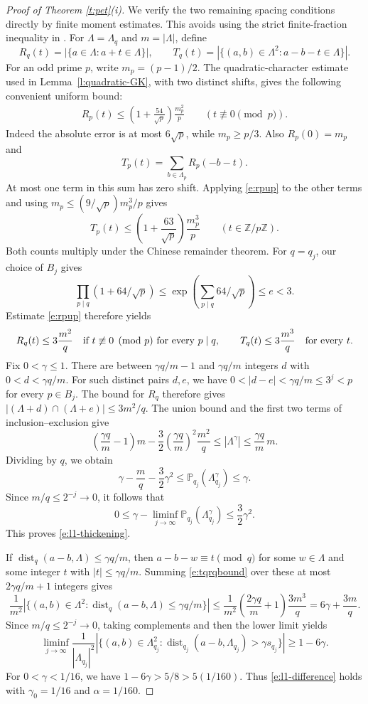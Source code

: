 \documentclass[12pt,reqno]{amsart}
\numberwithin{equation}{section}
\theoremstyle{definition}
\theoremstyle{remark}
\begin{document}
\begin{proof}[Proof of Theorem \ref{t:pet}\textup{(i)}]
We verify the two remaining spacing conditions directly by finite
moment estimates. This avoids using the strict finite-fraction
inequality in \cite[Lemma~3.2]{L09}. For $\Lambda=\Lambda_q$ and
$m=|\Lambda|$, define
\[
 R_q(t)=|\{a\in\Lambda:a+t\in\Lambda\}|,
 \qquad
 T_q(t)=|\{(a,b)\in\Lambda^2:a-b-t\in\Lambda\}|.
\]
For an odd prime $p$, write $m_p=(p-1)/2$. The quadratic-character
estimate used in Lemma~\ref{l:quadratic-GK}, with two distinct shifts,
gives the following convenient uniform bound:
\begin{align}\label{e:rpup}
    R_p(t)\leq\left(1+\frac{54}{\sqrt p}\right)\frac{m_p^2}{p}
 \qquad(t\not\equiv0\pmod p).
\end{align}
Indeed the absolute error is at most $6\sqrt p$, while $m_p\geq p/3$.
Also $R_p(0)=m_p$ and
\[
 T_p(t)=\sum_{b\in\Lambda_p}R_p(-b-t).
\]
At most one term in this sum has zero shift. Applying \eqref{e:rpup} to the other terms and using
$m_p\leq(9/\sqrt p)m_p^3/p$ gives
\[
 T_p(t)\leq\left(1+\frac{63}{\sqrt p}\right)\frac{m_p^3}{p}
 \qquad(t\in\mathbb Z/p\mathbb Z).
\]
Both counts multiply under the Chinese remainder theorem. For
\(q=q_j\), our choice of \(B_j\) gives
\[\prod_{p\mid q}(1+64/\sqrt p)
\leq\exp(\sum_{p\mid q}64/\sqrt p)\leq e<3.\]
Estimate \eqref{e:rpup} therefore yields
\begin{align}\label{e:tqrqbound}
 R_q(t)\leq3\frac{m^2}{q}
 \quad\hbox{if }t\not\equiv0\pmod p\text{ for every }p\mid q,
 \qquad
 T_q(t)\leq3\frac{m^3}{q}\quad\hbox{for every }t.
\end{align}
Fix \(0<\gamma\leq1\). There are between \(\gamma q/m-1\) and
\(\gamma q/m\) integers \(d\) with \(0<d<\gamma q/m\).
For such distinct pairs \(d,e\), we have
\(0<|d-e|<\gamma q/m\leq3^j<p\) for every \(p\in B_j\).
The bound for \(R_q\) therefore gives
\(|(\Lambda+d)\cap(\Lambda+e)|\leq3m^2/q\).
The union bound and the first two terms of inclusion--exclusion give
\[
 \left(\frac{\gamma q}{m}-1\right)m
 -\frac32\left(\frac{\gamma q}{m}\right)^2\frac{m^2}{q}
 \leq|\Lambda^\gamma|
 \leq\frac{\gamma q}{m}\,m.
\]
Dividing by \(q\), we obtain
\[
 \gamma-\frac mq-\frac32\gamma^2
 \leq\mathbb P_{q_j}(\Lambda_{q_j}^{\gamma})\leq\gamma.
\]
Since \(m/q\leq2^{-j}\to0\), it follows that
\[
 0\leq\gamma-\liminf_{j\to\infty}
 \mathbb P_{q_j}(\Lambda_{q_j}^{\gamma})
 \leq\frac32\gamma^2.
\]
This proves \eqref{e:l1-thickening}.

If \(\operatorname{dist}_q(a-b,\Lambda)\leq\gamma q/m\), then
\(a-b-w\equiv t\pmod q\) for some \(w\in\Lambda\) and some
integer \(t\) with \(|t|\leq\gamma q/m\).
Summing \eqref{e:tqrqbound} over these at most
\(2\gamma q/m+1\) integers gives
\[
 \frac1{m^2}
 |\{(a,b)\in\Lambda^2:
       \operatorname{dist}_q(a-b,\Lambda)\leq\gamma q/m\}|
 \leq
 \frac1{m^2}\left(\frac{2\gamma q}{m}+1\right)\frac{3m^3}{q}
 =6\gamma+\frac{3m}{q}.
\]
Since \(m/q\leq2^{-j}\to0\), taking complements and then the
lower limit yields
\[
 \liminf_{j\to\infty}\frac1{|\Lambda_{q_j}|^2}
 |\{(a,b)\in\Lambda_{q_j}^2:
      \operatorname{dist}_{q_j}(a-b,\Lambda_{q_j})>
                      \gamma s_{q_j}\}|
 \geq1-6\gamma.
\]
For \(0<\gamma<1/16\), we have
\(1-6\gamma>5/8>5(1/160)\).
Thus \eqref{e:l1-difference} holds with
\(\gamma_0=1/16\) and \(\alpha=1/160\).


\end{proof}
\end{document}
